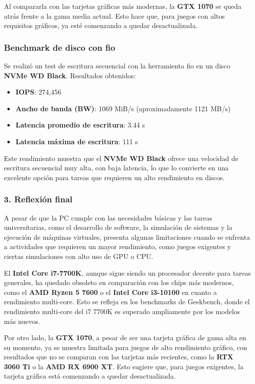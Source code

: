 Al compararla con las tarjetas gráficas más modernas, la \textbf{GTX 1070} se queda atrás frente a la gama media actual. Esto hace que, para juegos con altos requisitos gráficos, ya esté comenzando a quedar desactualizada.


\subsubsection*{Benchmark de disco con \textbf{fio}}
Se realizó un test de escritura secuencial con la herramienta fio en un disco \textbf{NVMe WD Black}.  
Resultados obtenidos:
\begin{itemize}
    \item \textbf{IOPS}: 274,456
    \item \textbf{Ancho de banda (BW)}: 1069 MiB/s (aproximadamente 1121 MB/s)
    \item \textbf{Latencia promedio de escritura}: 3.44 \textmu s
    \item \textbf{Latencia máxima de escritura}: 111 \textmu s
\end{itemize}

Este rendimiento muestra que el \textbf{NVMe WD Black} ofrece una velocidad de escritura secuencial muy alta, con baja latencia, lo que lo convierte en una excelente opción para tareas que requieren un alto rendimiento en discos.

\subsubsection*{3. Reflexión final}

A pesar de que la PC cumple con las necesidades básicas y las tareas universitarias, como el desarrollo de software, la simulación de sistemas y la ejecución de máquinas virtuales, presenta algunas limitaciones cuando se enfrenta a actividades que requieren un mayor rendimiento, como juegos exigentes y ciertas simulaciones con alto uso de GPU o CPU.

El \textbf{Intel Core i7-7700K}, aunque sigue siendo un procesador decente para tareas generales, ha quedado obsoleto en comparación con los chips más modernos, como el \textbf{AMD Ryzen 5 7600} o el \textbf{Intel Core i3-10100} en cuanto a rendimiento multi-core. Esto se refleja en los benchmarks de Geekbench, donde el rendimiento multi-core del i7 7700K es superado ampliamente por los modelos más nuevos.

Por otro lado, la \textbf{GTX 1070}, a pesar de ser una tarjeta gráfica de gama alta en su momento, ya se muestra limitada para juegos de alto rendimiento gráfico, con resultados que no se comparan con las tarjetas más recientes, como la \textbf{RTX 3060 Ti} o la \textbf{AMD RX 6900 XT}. Esto sugiere que, para juegos exigentes, la tarjeta gráfica está comenzando a quedar desactualizada.

